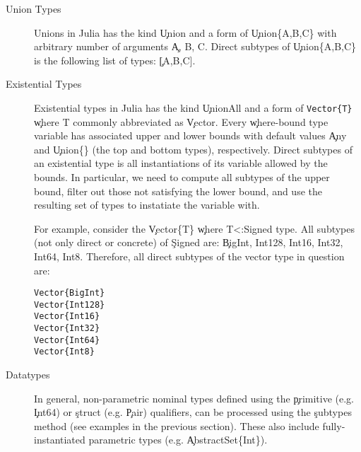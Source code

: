 
\begin{description}

  \item[Union Types]
        Unions in Julia has the kind \c{Union} and a form of \c{Union\{A,B,C\}}
        with arbitrary number of arguments \c{A, B, C}.
        Direct subtypes of \c{Union\{A,B,C\}} is the following list of types: \c{[A,B,C]}.

  \item[Existential Types]
        Existential types in Julia has the kind \c{UnionAll} and a form of
        \lstinline|Vector{T}| \c{where T} commonly abbreviated as \c{Vector}. Every
        \c{where}-bound type variable has associated upper and lower bounds with
        default values \c{Any} and \c{Union\{\}} (the top and bottom types),
        respectively. Direct subtypes of an existential type is all
        instantiations of its variable allowed by the bounds. In particular, we
        need to compute all subtypes of the upper bound, filter out those not
        satisfying the lower bound, and use the resulting set of types to
        instatiate the variable with.

        For example, consider the \c{Vector\{T\}} \c{where T<:Signed} type.
        All subtypes (not only direct or concrete) of \c{Signed} are:
        \c{BigInt, Int128, Int16, Int32, Int64, Int8}. Therefore, all direct
        subtypes of the vector type in question are:

\begin{minipage}{.92\textwidth}
        \begin{lstlisting}
Vector{BigInt}
Vector{Int128}
Vector{Int16}
Vector{Int32}
Vector{Int64}
Vector{Int8}
        \end{lstlisting}
\end{minipage}


  \item[Datatypes]
        In general, non-parametric nominal types defined using the \c{primitive} (e.g. \c{Int64}) or
        \c{struct} (e.g. \c{Pair}) qualifiers,  can be processed
        using the \c{subtypes} method (see examples in the previous section).%
        These also include fully-instantiated parametric types
        (e.g. \c{AbstractSet\{Int\}}).


\end{description}

